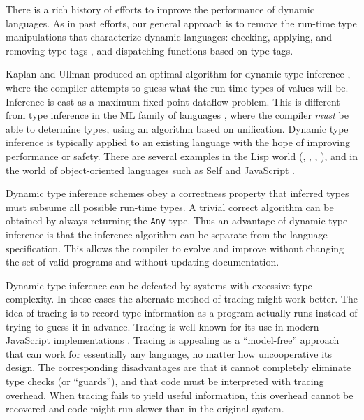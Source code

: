 \documentclass[9pt]{sigplanconf}
\begin{document}
There is a rich history of efforts to improve the performance of
dynamic languages. As in past efforts, our general approach is to
remove the run-time type manipulations
that characterize dynamic languages: checking, applying, and removing
type tags \cite{taggingopt}, and dispatching functions based on
type tags.

Kaplan and Ullman produced an optimal algorithm
for dynamic type inference \cite{kaplanullman}, where the compiler
attempts to guess what the run-time types of values will be.
Inference is cast as a maximum-fixed-point dataflow problem.
This is different from type inference in the ML family of languages
\cite{MLtypeinf}, where the compiler \emph{must} be able to determine
types, using an algorithm based on unification.
Dynamic type inference is typically applied to an existing language
with the hope of improving performance or safety. There are several
examples in the
Lisp world (\cite{TICL}, \cite{pticl}, \cite{nimble}, \cite{taggingopt}),
and in the world of object-oriented languages such as Self \cite{selflang}
and JavaScript \cite{typeinfjavascript}.


Dynamic type inference schemes obey a correctness property that
inferred types must subsume all possible run-time
types. A trivial correct algorithm can be obtained by always returning
the \texttt{Any} type. Thus an advantage of dynamic type inference is
that the inference algorithm can be separate from the language specification.
This allows the compiler to evolve and improve without changing the set of
valid programs and without updating documentation.

Dynamic type inference can be defeated by systems with
excessive type complexity. In these cases the alternate method of
tracing \cite{tracingjit} might work better.
The idea of tracing is to record type
information as a program actually runs instead of trying to guess it in
advance. Tracing is well known for its use in modern JavaScript
implementations \cite{tracingjit2}.
Tracing is appealing as a ``model-free'' approach that can work for
essentially any language, no matter how uncooperative its design. The
corresponding disadvantages are that it cannot completely eliminate type
checks (or ``guards''), and that code must be interpreted with tracing overhead.
When tracing fails to yield useful information, this overhead cannot be
recovered and code might run slower than in the original system.
\end{document}
